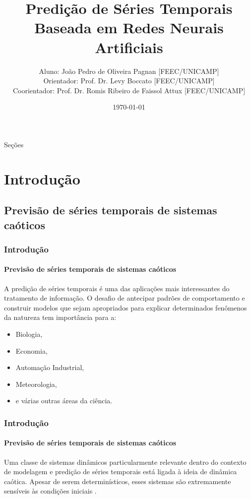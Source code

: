 \documentclass[aspectratio=169]{beamer}
\title[XXIX Congresso de Iniciação Científica - UNICAMP]{
 Predição de Séries Temporais Baseada em Redes Neurais
Artificiais}
\author[João Pedro O. Pagnan]{ \footnotesize
  Aluno: João Pedro de Oliveira Pagnan [FEEC/UNICAMP]\\
  Orientador: Prof. Dr. Levy Boccato [FEEC/UNICAMP]\\
  Coorientador: Prof. Dr. Romis Ribeiro de Faissol Attux [FEEC/UNICAMP]\\\medskip
  }
\institute[Universidade Estadual de Campinas ]{
  Departamento de Engenharia de Computação e Automação Industrial -- DCA \\
  }
\date{\scriptsize \today}
\begin{document}
\begin{frame}
  \titlepage
\end{frame}

\begin{frame}{Seções}
\begin{multicols}{2}
    \footnotesize \tableofcontents
\end{multicols}
\end{frame}

\section{Introdução}
\subsection{Previsão de séries temporais de sistemas caóticos}
\begin{frame}
    \frametitle{Introdução}
    \framesubtitle{Previsão de séries temporais de sistemas caóticos}
    \justifying A predição de séries temporais é uma das aplicações mais interessantes do tratamento de informação. O desafio de antecipar padrões de comportamento e construir modelos que sejam apropriados para explicar determinados fenômenos da natureza tem importância para a:
    
    \begin{itemize}[<+-| alert@+>]
        \item Biologia,
        \item Economia,
        \item Automação Industrial,
        \item Meteorologia,
        \item e várias outras áreas da ciência.
    \end{itemize}
\end{frame}

\begin{frame}
    \frametitle{Introdução}
    \framesubtitle{Previsão de séries temporais de sistemas caóticos}
    \justifying Uma classe de sistemas dinâmicos particularmente relevante dentro do contexto de modelagem e predição de séries temporais está ligada à ideia de dinâmica caótica. Apesar de serem determinísticos, esses sistemas são extremamente sensíveis às condições iniciais \cite{fiedler1994caos}.

\end{frame}
\end{document}
